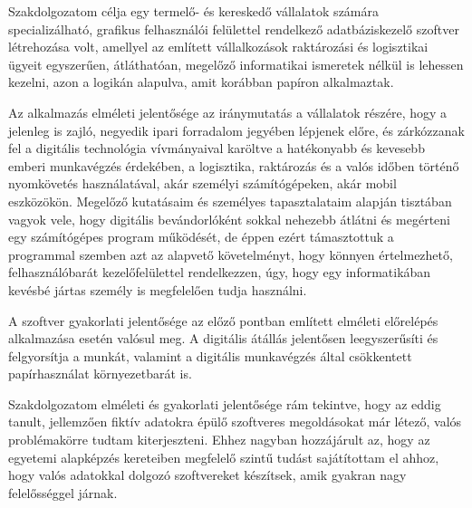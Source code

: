 

\hspace{12.5mm}Szakdolgozatom célja egy termelő- és kereskedő vállalatok számára specializálható, grafikus felhasználói felülettel rendelkező adatbáziskezelő szoftver létrehozása volt, amellyel az említett vállalkozások raktározási és logisztikai ügyeit egyszerűen, átláthatóan, megelőző informatikai ismeretek nélkül is lehessen kezelni, azon a logikán alapulva, amit korábban papíron alkalmaztak.


\setlength{\parindent}{12.5mm}Az alkalmazás elméleti jelentősége az iránymutatás a vállalatok részére, hogy a jelenleg is zajló, negyedik ipari forradalom jegyében lépjenek előre, és zárkózzanak fel a digitális technológia vívmányaival karöltve a hatékonyabb és kevesebb emberi munkavégzés érdekében, a logisztika, raktározás és a valós időben történő nyomkövetés használatával, akár személyi számítógépeken, akár mobil eszközökön. Megelőző kutatásaim és személyes tapasztalataim alapján tisztában vagyok vele, hogy digitális bevándorlóként sokkal nehezebb átlátni és megérteni egy számítógépes program működését, de éppen ezért támasztottuk a programmal szemben azt az alapvető követelményt, hogy könnyen értelmezhető, felhasználóbarát kezelőfelülettel rendelkezzen, úgy, hogy egy informatikában kevésbé jártas személy is megfelelően tudja használni.


\setlength{\parindent}{12.5mm}A szoftver gyakorlati jelentősége az előző pontban említett elméleti előrelépés alkalmazása esetén valósul meg. A digitális átállás jelentősen leegyszerűsíti és felgyorsítja a munkát, valamint a digitális munkavégzés által csökkentett papírhasználat környezetbarát is.


\setlength{\parindent}{12.5mm}Szakdolgozatom elméleti és gyakorlati jelentősége rám tekintve, hogy az eddig tanult, jellemzően fiktív adatokra épülő szoftveres megoldásokat már létező, valós problémakörre tudtam kiterjeszteni. Ehhez nagyban hozzájárult az, hogy az egyetemi alapképzés kereteiben megfelelő szintű tudást sajátítottam el ahhoz, hogy valós adatokkal dolgozó szoftvereket készítsek, amik gyakran nagy felelősséggel járnak.
